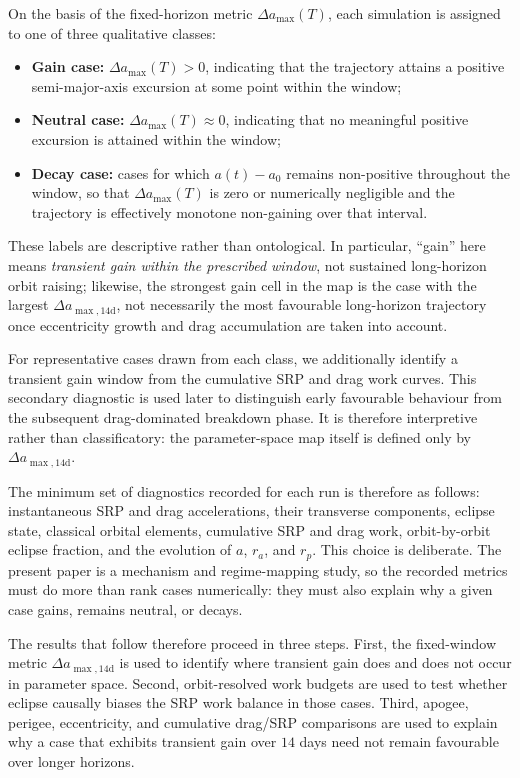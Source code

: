 \vspace{5pt}
\par\noindent On the basis of the fixed-horizon metric \(\Delta a_{\max}(T)\), each simulation is assigned to one of three qualitative classes:
\begin{itemize}
    \item \textbf{Gain case:} \(\Delta a_{\max}(T) > 0\), indicating that the trajectory attains a positive semi-major-axis excursion at some point within the window;
    \item \textbf{Neutral case:} \(\Delta a_{\max}(T) \approx 0\), indicating that no meaningful positive excursion is attained within the window;
    \item \textbf{Decay case:} cases for which \(a(t)-a_0\) remains non-positive throughout the window, so that \(\Delta a_{\max}(T)\) is zero or numerically negligible and the trajectory is effectively monotone non-gaining over that interval.
\end{itemize}
These labels are descriptive rather than ontological. In particular, ``gain'' here means \emph{transient gain within the prescribed window}, not sustained long-horizon orbit raising; likewise, the strongest gain cell in the map is the case with the largest \(\Delta a_{\max,14\mathrm{d}}\), not necessarily the most favourable long-horizon trajectory once eccentricity growth and drag accumulation are taken into account.


\vspace{5pt}
\par\noindent For representative cases drawn from each class, we additionally identify a transient gain window from the cumulative SRP and drag work curves. This secondary diagnostic is used later to distinguish early favourable behaviour from the subsequent drag-dominated breakdown phase. It is therefore interpretive rather than classificatory: the parameter-space map itself is defined only by \(\Delta a_{\max,14\mathrm{d}}\).

\vspace{5pt}
\par\noindent The minimum set of diagnostics recorded for each run is therefore as follows: instantaneous SRP and drag accelerations, their transverse components, eclipse state, classical orbital elements, cumulative SRP and drag work, orbit-by-orbit eclipse fraction, and the evolution of \(a\), \(r_a\), and \(r_p\). This choice is deliberate. The present paper is a mechanism and regime-mapping study, so the recorded metrics must do more than rank cases numerically: they must also explain why a given case gains, remains neutral, or decays.

\vspace{5pt}
\par\noindent The results that follow therefore proceed in three steps. First, the fixed-window metric \(\Delta a_{\max,14\mathrm{d}}\) is used to identify where transient gain does and does not occur in parameter space. Second, orbit-resolved work budgets are used to test whether eclipse causally biases the SRP work balance in those cases. Third, apogee, perigee, eccentricity, and cumulative drag/SRP comparisons are used to explain why a case that exhibits transient gain over \(14\) days need not remain favourable over longer horizons.
\FloatBarrier